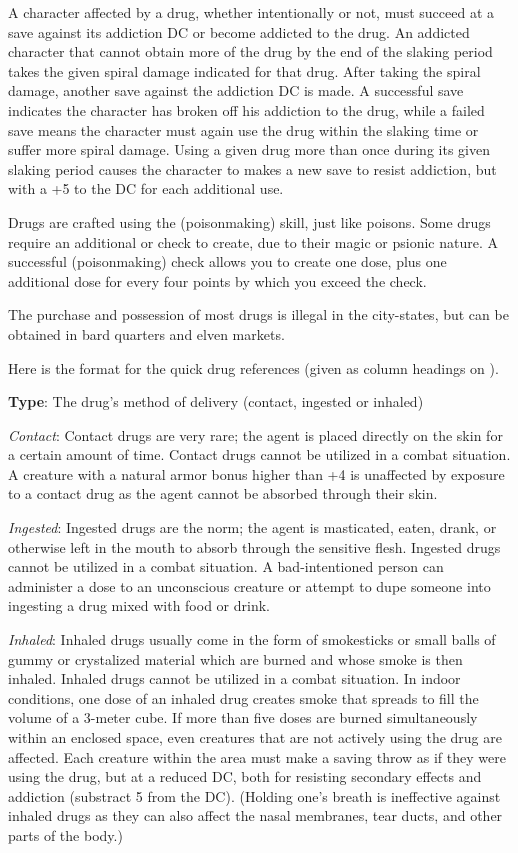 A character affected by a drug, whether intentionally or not, must succeed at a save against its addiction DC or become addicted to the drug. An addicted character that cannot obtain more of the drug by the end of the slaking period takes the given spiral damage indicated for that drug. After taking the spiral damage, another save against the addiction DC is made. A successful save indicates the character has broken off his addiction to the drug, while a failed save means the character must again use the drug within the slaking time or suffer more spiral damage. Using a given drug more than once during its given slaking period causes the character to makes a new save to resist addiction, but with a +5 to the DC for each additional use.

Drugs are crafted using the  (poisonmaking) skill, just like poisons. Some drugs require an additional  or  check to create, due to their magic or psionic nature. A successful  (poisonmaking) check allows you to create one dose, plus one additional dose for every four points by which you exceed the  check.

The purchase and possession of most drugs is illegal in the city-states, but can be obtained in bard quarters and elven markets.

Here is the format for the quick drug references (given as column headings on ).

\textbf{Type}: The drug's method of delivery (contact, ingested or inhaled)

\textit{Contact}: Contact drugs are very rare; the agent is placed directly on the skin for a certain amount of time. Contact drugs cannot be utilized in a combat situation. A creature with a natural armor bonus higher than +4 is unaffected by exposure to a contact drug as the agent cannot be absorbed through their skin.

\textit{Ingested}: Ingested drugs are the norm; the agent is masticated, eaten, drank, or otherwise left in the mouth to absorb through the sensitive flesh. Ingested drugs cannot be utilized in a combat situation. A bad-intentioned person can administer a dose to an unconscious creature or attempt to dupe someone into ingesting a drug mixed with food or drink.

\textit{Inhaled}: Inhaled drugs usually come in the form of smokesticks or small balls of gummy or crystalized material which are burned and whose smoke is then inhaled. Inhaled drugs cannot be utilized in a combat situation. In indoor conditions, one dose of an inhaled drug creates smoke that spreads to fill the volume of a 3-meter cube. If more than five doses are burned simultaneously within an enclosed space, even creatures that are not actively using the drug are affected. Each creature within the area must make a saving throw as if they were using the drug, but at a reduced DC, both for resisting secondary effects and addiction (substract 5 from the DC). (Holding one's breath is ineffective against inhaled drugs as they can also affect the nasal membranes, tear ducts, and other parts of the body.)


